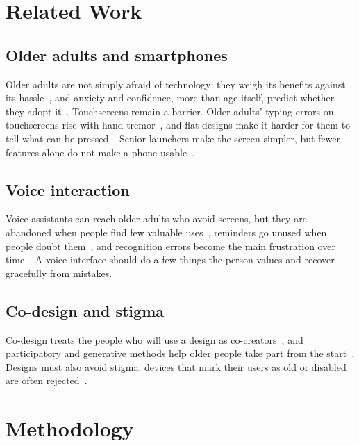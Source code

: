 \documentclass[acmtog,nonacm]{acmart}
\begin{document}
\section{Related Work}\label{sec:related}

\subsection{Older adults and smartphones}
Older adults are not simply afraid of technology: they weigh its benefits against its hassle~\cite{mitzner2010older}, and anxiety and confidence, more than age itself, predict whether they adopt it~\cite{czaja2006factors}. Touchscreens remain a barrier. Older adults' typing errors on touchscreens rise with hand tremor~\cite{nicolau2012elderly}, and flat designs make it harder for them to tell what can be pressed~\cite{urbano2022skeuomorphism}. Senior launchers make the screen simpler, but fewer features alone do not make a phone usable~\cite{petrovcic2018smart}.

\subsection{Voice interaction}
Voice assistants can reach older adults who avoid screens, but they are abandoned when people find few valuable uses~\cite{trajkova2020alexa}, reminders go unused when people doubt them~\cite{pradhan2020use}, and recognition errors become the main frustration over time~\cite{kim2021exploring}. A voice interface should do a few things the person values and recover gracefully from mistakes.

\subsection{Co-design and stigma}
Co-design treats the people who will use a design as co-creators~\cite{sanders2008cocreation}, and participatory and generative methods help older people take part from the start~\cite{lindsay2012engaging, andersen2019magic}. Designs must also avoid stigma: devices that mark their users as old or disabled are often rejected~\cite{shinohara2011shadow, neven2010obviously}.

\section{Methodology}\label{sec:method}
\end{document}
